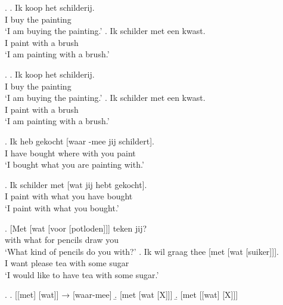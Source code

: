 \documentclass[xcolor=dvipsnames,10pt]{beamer}
\begin{document}
\begin{frame}

\ex.
\ag. Ik koop het schilderij.\\
 I buy the painting\\
 `I am buying the painting.'\label{ex:kopen}
\bg. Ik schilder met een kwast.\\
 I paint with a brush\\
 `I am painting with a brush.'\label{ex:schilderen}

 \pause

\end{frame}

\ex.
\ag. Ik koop het schilderij.\\
 I buy the painting\\
 `I am buying the painting.'\label{ex:kopen}
\bg. Ik schilder met een kwast.\\
 I paint with a brush\\
 `I am painting with a brush.'\label{ex:schilderen}

\pause

\exg. Ik heb gekocht [waar -mee jij schildert].\\
 I have bought where with you paint\\
 `I bought what you are painting with.'\label{ex:mismatchwaar-mee}

\pause

\exg. Ik schilder met [wat jij hebt gekocht].\\
I paint with what you have bought\\
`I paint with what you bought.'\label{ex:mismatchmetwat}

\begin{frame}

\exg. [Met [wat [voor [potloden]]] teken jij?\\
 with what for pencils draw you\\
 `What kind of pencils do you with?'\label{ex:watwasfur}
\exg. Ik wil graag thee [met [wat [suiker]]].\\
 I want please tea with some sugar\\
 `I would like to have tea with some sugar.'\label{ex:watindef}

\pause

\ex.\label{ex:summaryconst}
\a. [[met] [wat]] → [waar-mee]\label{ex:waar-meefr}
\b. [met [wat [X]]]\label{ex:metwatx}
\b. [met [[wat] [X]]]\label{ex:metwatfr}

\end{frame}
\end{document}
